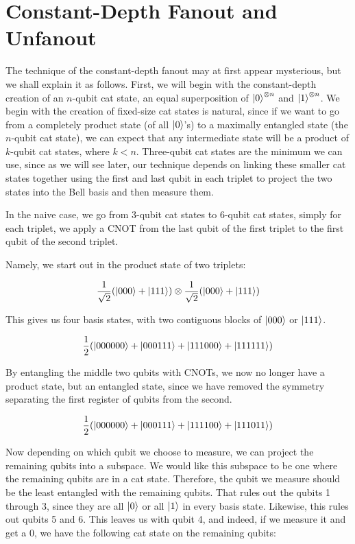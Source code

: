 \documentclass{article}
\begin{document}
\section{Constant-Depth Fanout and Unfanout}

The technique of the constant-depth fanout may at first appear mysterious,
but we shall explain it as follows. First, we will begin with the
constant-depth creation of an $n$-qubit cat state, an equal superposition of
$\left\vert{0}\right\rangle^{\otimes n}$ and $\left\vert{1}\right\rangle^{\otimes n}$. We begin with
the creation of fixed-size
cat states is natural, since if we want to go from a completely product
state (of all $\left\vert{0}\right\rangle$'s) to a maximally entangled state (the $n$-qubit
cat state), we can expect that any intermediate state will be a product of
$k$-qubit cat states, where $k < n$. Three-qubit cat states are the
minimum we can use, since as we will see later, our technique depends on
linking these smaller cat states together using the first and last qubit
in each triplet to project the two states into the Bell basis and then
measure them.

In the naive case, we go from $3$-qubit cat states to $6$-qubit cat states,
simply for each triplet, we apply a CNOT from the last qubit of the first
triplet to the first qubit of the second triplet.

Namely, we start out in the product state of two triplets:

\begin{equation}
\frac{1}{\sqrt{2}}(\left\vert{000}\right\rangle + \left\vert{111}\right\rangle)\otimes
\frac{1}{\sqrt{2}}(\left\vert{000}\right\rangle + \left\vert{111}\right\rangle)
\end{equation}

This gives us four basis states, with two contiguous blocks of $\left\vert{000}\right\rangle$
or $\left\vert{111}\right\rangle$.

\begin{equation}
\frac{1}{2}(\left\vert{000000}\right\rangle + \left\vert{000111}\right\rangle + \left\vert{111000}\right\rangle + \left\vert{111111}\right\rangle)
\end{equation}

By entangling the middle two qubits with CNOTs, we now no longer have a
product state, but an entangled state, since we have removed the symmetry
separating the first register of qubits from the second.

\begin{equation}
\frac{1}{2}(\left\vert{000000}\right\rangle + \left\vert{000111}\right\rangle + \left\vert{111100}\right\rangle + \left\vert{111011}\right\rangle)
\end{equation}

Now depending on which qubit we choose to measure, we can project the remaining
qubits into a subspace. We would like this subspace to be one where the
remaining qubits are in a cat state. Therefore, the qubit we measure should be
the least entangled with the remaining qubits. That rules out the qubits
1 through 3, since they are all $\left\vert{0}\right\rangle$ or all $\left\vert{1}\right\rangle$ in every
basis state. Likewise, this rules out qubits 5 and 6. This leaves us with
qubit 4, and indeed, if we measure it and get a $0$, we have the following
cat state on the remaining qubits:
\end{document}
